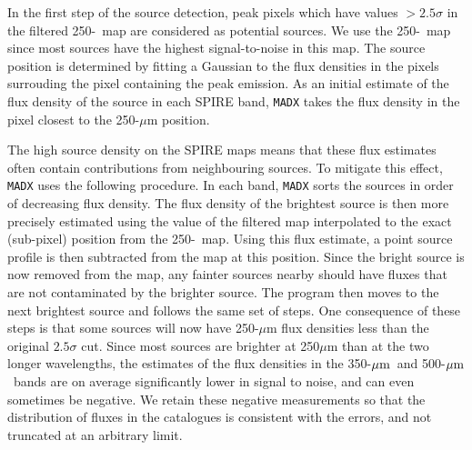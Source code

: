 \documentclass[a4paper,fleqn,usenatbib, twocolumn]{aastex61}
\begin{document}
In the first step of the source detection, peak pixels which have
values $>2.5\sigma$ in the filtered 250-\micron\ map are considered as
potential sources.  We use the 250-\micron\ map since most sources have
the highest signal-to-noise in this map.  The source position is
determined by fitting a Gaussian to the flux densities in the pixels
surrouding the pixel containing the peak emission.  As an initial
estimate of the flux density of the source in each SPIRE band, {\tt MADX}
takes the flux density in the pixel closest to the 250-$\mu$m
position.

The high source density on the SPIRE maps means that these flux
estimates often contain contributions from neighbouring sources.  To
mitigate this effect, {\tt MADX} uses the following procedure.  In each
band, {\tt MADX} sorts the sources in order of decreasing flux density.  The
flux density of the brightest source is then more precisely estimated
using the value of the filtered map interpolated to the exact
(sub-pixel) position from the 250-\micron\ map.  Using this flux
estimate, a point source profile is then subtracted from the map at
this position. Since the bright source is now removed from the map,
any fainter sources nearby should have fluxes that are not
contaminated by the brighter source. The program then moves to the
next brightest source and follows the same set of steps.  One
consequence of these steps is that some sources will now have
250-$\mu$m flux densities less than the original $2.5\sigma$ cut.
Since most sources are brighter at 250$\mu$m than at the two longer
wavelengths, the estimates of the flux densities in the 350-$\mbox{$\mu$m}$\ and
500-$\mbox{$\mu$m}$\ bands are on average significantly lower in signal to noise,
and can even sometimes be negative. We retain these negative
measurements so that the  distribution of fluxes in the
catalogues is consistent with the errors, and not truncated at an
arbitrary limit. 
\end{document}
